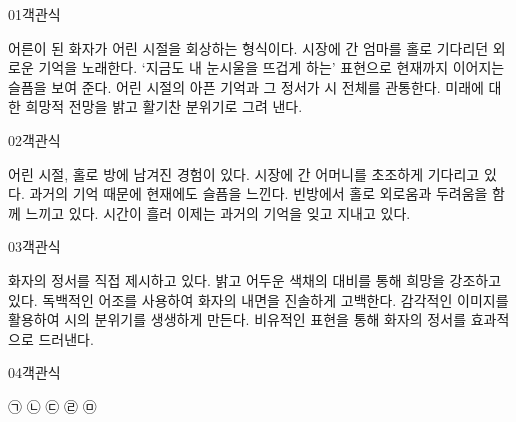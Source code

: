 \documentclass[fs9,seriesRus]{korfarm-base}
\begin{document}

\par\medskip
\kfBeginMC
\begin{kfQBlock}{01}{객관식}
\begin{kfChoices}
\kfChoice 어른이 된 화자가 어린 시절을 회상하는 형식이다.
\kfChoice 시장에 간 엄마를 홀로 기다리던 외로운 기억을 노래한다.
\kfChoice ‘지금도 내 눈시울을 뜨겁게 하는’ 표현으로 현재까지 이어지는 슬픔을 보여 준다.
\kfChoice 어린 시절의 아픈 기억과 그 정서가 시 전체를 관통한다.
\kfChoice 미래에 대한 희망적 전망을 밝고 활기찬 분위기로 그려 낸다.
\end{kfChoices}
\end{kfQBlock}
\begin{kfQBlock}{02}{객관식}
\begin{kfChoices}
\kfChoice 어린 시절, 홀로 방에 남겨진 경험이 있다.
\kfChoice 시장에 간 어머니를 초조하게 기다리고 있다.
\kfChoice 과거의 기억 때문에 현재에도 슬픔을 느낀다.
\kfChoice 빈방에서 홀로 외로움과 두려움을 함께 느끼고 있다.
\kfChoice 시간이 흘러 이제는 과거의 기억을 잊고 지내고 있다.
\end{kfChoices}
\end{kfQBlock}
\begin{kfQBlock}{03}{객관식}
\begin{kfChoices}
\kfChoice 화자의 정서를 직접 제시하고 있다.
\kfChoice 밝고 어두운 색채의 대비를 통해 희망을 강조하고 있다.
\kfChoice 독백적인 어조를 사용하여 화자의 내면을 진솔하게 고백한다.
\kfChoice 감각적인 이미지를 활용하여 시의 분위기를 생생하게 만든다.
\kfChoice 비유적인 표현을 통해 화자의 정서를 효과적으로 드러낸다.
\end{kfChoices}
\end{kfQBlock}
\begin{kfQBlock}{04}{객관식}
\begin{kfChoices}
\kfChoice ㉠
\kfChoice ㉡
\kfChoice ㉢
\kfChoice ㉣
\kfChoice ㉤
\end{kfChoices}
\end{kfQBlock}
\end{document}
